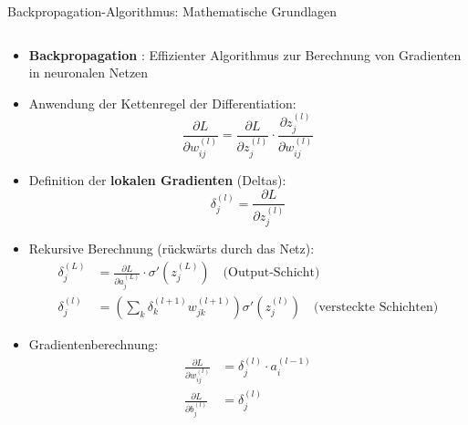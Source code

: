 \documentclass[aspectratio=1610, xcolor=dvipsnames, 9pt]{beamer}
\begin{document}
      \begin{frame}{Backpropagation-Algorithmus: Mathematische Grundlagen}
        \begin{columns}
          \begin{column}{1\textwidth}
            \begin{itemize}
              \item \textbf{Backpropagation} \cite{rumelhart1986}: Effizienter Algorithmus zur Berechnung von Gradienten in neuronalen Netzen
              \item Anwendung der Kettenregel der Differentiation:
              \begin{equation}
                \frac{\partial L}{\partial w_{ij}^{(l)}} = \frac{\partial L}{\partial z_j^{(l)}} \cdot \frac{\partial z_j^{(l)}}{\partial w_{ij}^{(l)}}
              \end{equation}
              \item Definition der \textbf{lokalen Gradienten} (Deltas):
              \begin{equation}
                \delta_j^{(l)} = \frac{\partial L}{\partial z_j^{(l)}}
              \end{equation}
              \item Rekursive Berechnung (rückwärts durch das Netz):
              \begin{align}
                \delta_j^{(L)} &= \frac{\partial L}{\partial a_j^{(L)}} \cdot \sigma'(z_j^{(L)}) \quad \text{(Output-Schicht)} \\
                \delta_j^{(l)} &= \left(\sum_{k} \delta_k^{(l+1)} w_{jk}^{(l+1)}\right) \sigma'(z_j^{(l)}) \quad \text{(versteckte Schichten)}
              \end{align}
              \item Gradientenberechnung:
              \begin{align}
                \frac{\partial L}{\partial w_{ij}^{(l)}} &= \delta_j^{(l)} \cdot a_i^{(l-1)} \\
                \frac{\partial L}{\partial b_j^{(l)}} &= \delta_j^{(l)}
              \end{align}
            \end{itemize}
          \end{column}
        \end{columns}
      \end{frame}
\end{document}
